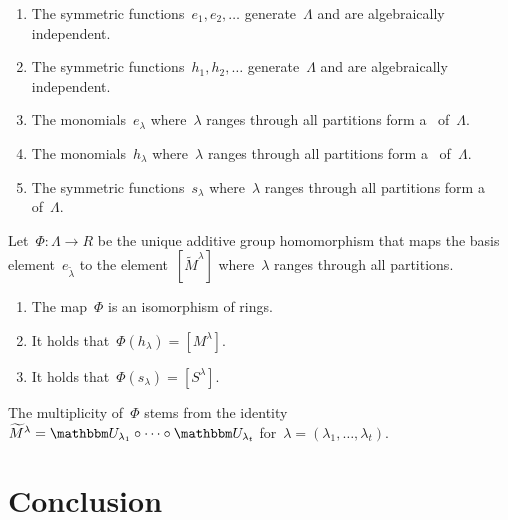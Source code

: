\documentclass[a4paper,10pt]{scrartcl}
\begin{document}
\begin{proposition}
  \leavevmode
  \begin{enumerate}
    \item
      The symmetric functions~$e_1, e_2, \dotsc$ generate~$\Lambda$ and are algebraically independent.
    \item
      The symmetric functions~$h_1, h_2, \dotsc$ generate~$\Lambda$ and are algebraically independent.
    \item
      The monomials~$e_\lambda$ where~$\lambda$ ranges through all partitions form a~{\basis{$\Integer$}} of~$\Lambda$.
    \item
      The monomials~$h_\lambda$ where~$\lambda$ ranges through all partitions form a~{\basis{$\Integer$}} of~$\Lambda$.
    \item
      The symmetric functions~$s_\lambda$ where~$\lambda$ ranges through all partitions form a~{\basis{$\Integer$}} of~$\Lambda$.
  \end{enumerate}
\end{proposition}


\begin{theorem}
  Let~$\Phi \colon \Lambda \to R$ be the unique additive group homomorphism that maps the basis element~$e_{\tilde{\lambda}}$ to the element~$[\widetilde{M}^\lambda]$ where~$\lambda$ ranges through all partitions.
  \begin{enumerate}
    \item
      The map~$\Phi$ is an isomorphism of rings.
    \item
      It holds that~$\Phi(h_\lambda) = [M^\lambda]$.
    \item
      It holds that~$\Phi(s_\lambda) = [S^\lambda]$.
  \end{enumerate}
\end{theorem}

The multiplicity of~$\Phi$ stems from the identity~$\widetilde{M}^\lambda = \signrep_{\lambda_1} \circ \dotsb \circ \signrep_{\lambda_t}$ for~$\lambda = (\lambda_1, \dotsc, \lambda_t)$.





\section{Conclusion}
\end{document}
